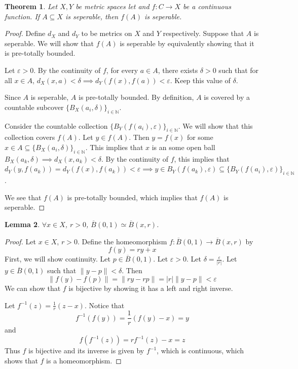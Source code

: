 \documentclass{article}
\newcommand{\cl}[1]{\overline{#1}}
\theoremstyle{plain} %
\newtheorem{thm}{Theorem}
\numberwithin{thm}{section} %
\newtheorem{lemma}[thm]{Lemma}
\theoremstyle{definition}
\begin{document}
    \begin{thm}
        Let \(X,Y\) be metric spaces let and \(f \colon C \to X\) be a continuous function. If \(A \subseteq X\) is seperable, then \(f(A)\) is seperable.
    \end{thm}
    \begin{proof}
        Define \(d_X\) and \(d_Y\) to be metrics on \(X\) and \(Y\) respectively. Suppose that \(A\) is seperable. We will show that \(f(A)\) is seperable by equivalently showing that it is pre-totally bounded.

        Let \(\varepsilon > 0\). By the continuity of \(f\), for every \(a \in A\), there exists \(\delta > 0\) such that for all \(x \in A\), \(d_X(x, a) < \delta \implies d_Y(f(x), f(a)) < \varepsilon\). Keep this value of \(\delta\).

        Since \(A\) is seperable, \(A\) is pre-totally bounded. By definition, \(A\) is covered by a countable subcover \(\{B_X(a_i, \delta)\}_{i\in\mathbb{N}}\).

        Consider the countable collection \(\{B_Y(f(a_i), \varepsilon)\}_{i\in\mathbb{N}}\). We will show that this collection covers \(f(A)\). Let \(y \in f(A)\). Then \(y = f(x)\) for some \(x \in A \subseteq \{B_X(a_i, \delta)\}_{i\in\mathbb{N}}\). This implies that \(x\) is an some open ball \(B_X(a_k, \delta) \implies d_X(x, a_k) < \delta\). By the continuity of \(f\), this implies that \(d_Y(y, f(a_k)) = d_Y(f(x), f(a_k)) < \varepsilon \implies y \in B_Y(f(a_k), \varepsilon) \subseteq \{B_Y(f(a_i), \varepsilon)\}_{i\in\mathbb{N}}\).

        We see that \(f(A)\) is pre-totally bounded, which implies that \(f(A)\) is seperable.
        
    \end{proof}

    \begin{lemma}
        \(\forall x \in X\), \(r > 0\), \(\cl{B}(0, 1) \simeq \cl{B}(x, r)\).
    \end{lemma}
    \begin{proof}
        Let \(x \in X\), \(r >0\). Define the homeomorphism \(f: \cl{B}(0, 1) \to \cl{B}(x, r)\) by
        \[
            f(y) = ry + x
        \]
        First, we will show continuity. Let \(p \in \cl{B}(0,1)\). Let \(\varepsilon > 0\). Let \(\delta = \frac{\varepsilon}{|r|}\). Let \(y \in \cl{B}(0,1)\) such that \(\|y - p\| < \delta\). Then
        \[
            \|f(y) - f(p)\| = \|ry-rp\| = |r|\|y-p\| < \varepsilon
        \]
        We can show that \(f\) is bijective by showing it has a left and right inverse.
        
        Let \(f^{-1}(z) = \frac{1}{r}(z - x)\). Notice that
        \[
            f^{-1}(f(y)) = \frac{1}{r}(f(y) - x) = y
        \]
        and
        \[
            f(f^{-1} (z)) = rf^{-1} (z) - x = z
        \]
        Thus \(f\) is bijective and its inverse is given by \(f^{-1}\), which is continuous, which shows that \(f\) is a homeomorphism.
        \smallbreak
    \end{proof}
\end{document}

